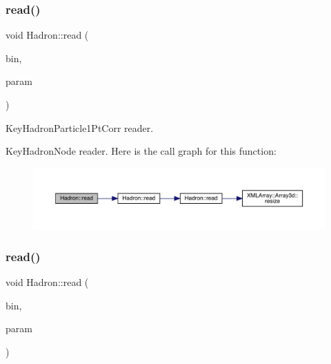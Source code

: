 \subsubsection{\texorpdfstring{read()}{read()}\hspace{0.1cm}{\footnotesize\ttfamily [80/94]}}
{\footnotesize\ttfamily void Hadron\+::read (\begin{DoxyParamCaption}\item[{\mbox{\hyperlink{classADATIO_1_1BinaryReader}{Binary\+Reader}} \&}]{bin,  }\item[{\mbox{\hyperlink{structHadron_1_1KeyHadronNode__t}{Key\+Hadron\+Node\+\_\+t}} \&}]{param }\end{DoxyParamCaption})}



Key\+Hadron\+Particle1\+Pt\+Corr reader. 

Key\+Hadron\+Node reader. Here is the call graph for this function\+:
\nopagebreak
\begin{figure}[H]
\begin{center}
\leavevmode
\includegraphics[width=350pt]{d1/daf/namespaceHadron_ac376de4f56715288fc1a3eb4e0cc6725_cgraph}
\end{center}
\end{figure}
\mbox{\label{namespaceHadron_a0567f3fb8f2db68b0a93251138c13a62}} 
\subsubsection{\texorpdfstring{read()}{read()}\hspace{0.1cm}{\footnotesize\ttfamily [81/94]}}
{\footnotesize\ttfamily void Hadron\+::read (\begin{DoxyParamCaption}\item[{\mbox{\hyperlink{classADATIO_1_1BinaryReader}{Binary\+Reader}} \&}]{bin,  }\item[{\mbox{\hyperlink{structHadron_1_1KeyHadronNPartIrrepOp__t_1_1CGPair__t}{Key\+Hadron\+N\+Part\+Irrep\+Op\+\_\+t\+::\+C\+G\+Pair\+\_\+t}} \&}]{param }\end{DoxyParamCaption})}

